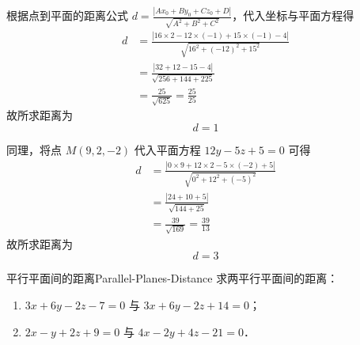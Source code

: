 \begin{solution}

    根据点到平面的距离公式 $d = \frac{|Ax_0 + By_0 + Cz_0 + D|}{\sqrt{A^2 + B^2 + C^2}}$，代入坐标与平面方程得
    \begin{equation}
        \begin{aligned}
            d & = \frac{|16 \times 2 - 12 \times (-1) + 15 \times (-1) - 4|}{\sqrt{16^2 + (-12)^2 + 15^2}} \\
              & = \frac{|32 + 12 - 15 - 4|}{\sqrt{256 + 144 + 225}}                                        \\
              & = \frac{25}{\sqrt{625}} = \frac{25}{25}
        \end{aligned}
    \end{equation}
    故所求距离为
    \begin{equation}
        \boxed{d = 1}
    \end{equation}


    同理，将点 $M(9, 2, -2)$ 代入平面方程 $12y - 5z + 5 = 0$ 可得
    \begin{equation}
        \begin{aligned}
            d & = \frac{|0 \times 9 + 12 \times 2 - 5 \times (-2) + 5|}{\sqrt{0^2 + 12^2 + (-5)^2}} \\
              & = \frac{|24 + 10 + 5|}{\sqrt{144 + 25}}                                             \\
              & = \frac{39}{\sqrt{169}} = \frac{39}{13}
        \end{aligned}
    \end{equation}
    故所求距离为
    \begin{equation}
        \boxed{d = 3}
    \end{equation}
\end{solution}


\begin{problem}{平行平面间的距离}{Parallel-Planes-Distance}
    求两平行平面间的距离：
    \begin{enumerate}
        \item $3x + 6y - 2z - 7 = 0$ 与 $3x + 6y - 2z + 14 = 0$；
        \item $2x - y + 2z + 9 = 0$ 与 $4x - 2y + 4z - 21 = 0$．
    \end{enumerate}
\end{problem}

